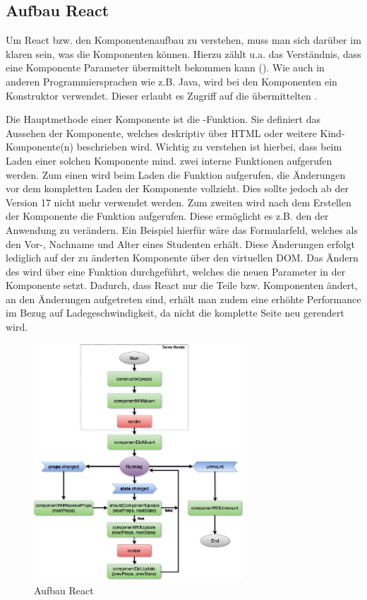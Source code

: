 
\subsection{Aufbau React}
\label{ssec:AufbauReact}

Um React bzw. den Komponentenaufbau zu verstehen, muss man sich darüber im klaren sein, was die Komponenten können. 
Hierzu zählt u.a. das Verständnis, dass eine Komponente Parameter übermittelt bekommen kann (\props). 
Wie auch in anderen Programmiersprachen wie z.B. Java, wird bei den Komponenten ein Konstruktor  verwendet.
Dieser erlaubt es Zugriff auf die übermittelten \props. 

Die Hauptmethode einer Komponente ist die \render-Funktion. 
Sie definiert das Aussehen der Komponente, welches deskriptiv über \acs{HTML} oder weitere Kind-Kompo\-nente(n) beschrieben wird. 
Wichtig zu verstehen ist hierbei, dass beim Laden einer solchen Komponente mind. zwei interne Funktionen aufgerufen werden. 
Zum einen wird beim Laden die Funktion \cwm aufgerufen, die Änderungen vor dem kompletten Laden der Komponente vollzieht.
Dies sollte jedoch ab der Version 17 nicht mehr verwendet werden. 
Zum zweiten wird nach dem Erstellen der Komponente die Funktion \cdm aufgerufen. 
Diese ermöglicht es z.B. den \state  der Anwendung zu verändern. 
Ein Beispiel hierfür wäre das Formularfeld, welches als \props den Vor-, Nachname und Alter eines Studenten erhält. 
Diese Änderungen erfolgt lediglich auf der zu änderten Komponente über den virtuellen \acs{DOM}. 
Das Ändern des \state wird über eine Funktion \exampleState durchgeführt, welches die neuen Parameter in der Komponente setzt.
Dadurch, dass React nur die Teile bzw. Komponenten ändert, an den Änderungen aufgetreten sind, erhält man zudem eine erhöhte Performance im Bezug auf Ladegeschwindigkeit, da nicht die komplette Seite neu gerendert wird. 

\begin{figure}[hp]
	\centering
	\includegraphics[width=0.70\textwidth, keepaspectratio]{img/client/Lifecycle.jpeg}
	\captionsetup{justification=centering, format=plain}
	\caption[Aufbau React]{Aufbau React \\ \quelle \cite{reactLifeCycle}}
	\label{fig:ReactLifecylce}
\end{figure}
